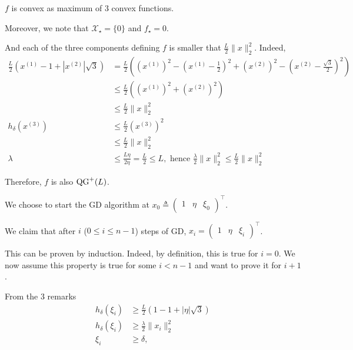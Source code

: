             $f$ is convex as maximum of 3 convex functions.
            
            Moreover, we note that $\mathcal{X}_\star = \lbrace 0 \rbrace$ and $f_\star = 0$.
            
            And each of the three components defining $f$ is smaller that $\frac{L}{2}\|x\|_2^2$.
            Indeed,
            \begin{align}
                \frac{L}{2}\left(x^{(1)} - 1 + |x^{(2)}|\sqrt{3}\right) & = \frac{L}{2}\left(\left(x^{(1)}\right)^2 - \left(x^{(1)} - \frac{1}{2}\right)^2 + \left(x^{(2)}\right)^2 - \left(x^{(2)} - \frac{\sqrt{3}}{2}\right)^2 \right) \nonumber \\
                & \leq \frac{L}{2} \left( \left(x^{(1)}\right)^2 + \left(x^{(2)}\right)^2 \right) \nonumber \\
                & \leq \frac{L}{2} \|x\|_2^2 \\
                h_{\delta}\left(x^{(3)}\right) & \leq \frac{L}{2}(x^{(3)})^2 \nonumber \\
                & \leq \frac{L}{2}\|x\|_2^2 \\
                \lambda & \leq \frac{L\eta}{2\eta} = \frac{L}{2} \leq L, \text{ hence }
                \frac{\lambda}{2}\|x\|_2^2 \leq \frac{L}{2}\|x\|_2^2
            \end{align}
            
            Therefore, $f$ is also $\operatorname{QG}^+(L)$.
            
            We choose to start the GD algorithm at $x_0 \triangleq \begin{pmatrix} 1 & \eta & \xi_0 \end{pmatrix}^\top$.
            
            We claim that after $i$ ($ 0 \leq i \leq n-1$) steps of GD, $x_i = \begin{pmatrix} 1 & \eta & \xi_i \end{pmatrix}^\top $.
            
            This can be proven by induction.
            Indeed, by definition, this is true for $i=0$.
            We now assume this property is true for some $i < n-1$ and want to prove it for $i+1$.
            
            From the 3 remarks
            \begin{align}
                h_{\delta}(\xi_i) & \geq \frac{L}{2}\left(1 - 1 + |\eta|\sqrt{3}\right) \\
                h_{\delta}(\xi_i) & \geq \frac{\lambda}{2}\|x_i\|_2^2 \\
                \xi_i & \geq \delta,
            \end{align}
            
